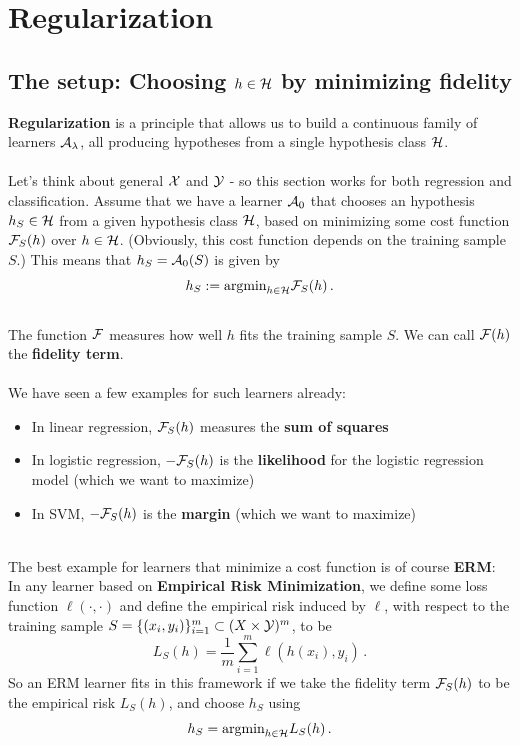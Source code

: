 \section{Regularization}


\subsection{The setup: Choosing $h\in\mathcal{H}$ by minimizing fidelity}

{\bf Regularization} is a principle that allows us to build a continuous family
of learners $\mathcal{A}_\lambda$, all producing hypotheses from a single
 hypothesis class $\mathcal{H}$.
\\~\\
 Let's think about general $\mathcal{X}$ and $\mathcal{Y}$ - so this section works for both
 regression and classification.
Assume that we have a learner $\mathcal{A}_0$ that chooses an hypothesis
$h_S\in\mathcal{H}$ 
from a given hypothesis class $\mathcal{H}$, based
on minimizing some cost function $\mathcal{F}_S(h)$ over $h\in\mathcal{H}$.
(Obviously, this cost function depends on the training sample
$S$.) 
This means that $h_S=\mathcal{A}_0(S)$ is given by
\[
  h_S := \text{argmin}_{h\in\mathcal{H}} \mathcal{F}_S(h)\,.
\]
~\\
The function $\mathcal{F}$ measures how well $h$ fits the training sample $S$. We can
call $\mathcal{F}(h)$ the {\bf fidelity term}.
\\~\\
We have seen a few examples for such learners already:
\begin{itemize}
  \item In linear regression, $\mathcal{F}_S(h)$ measures the {\bf sum of squares}
  \item In logistic regression, $-\mathcal{F}_S(h)$ is the {\bf likelihood} for the logistic
    regression model (which we want to
    maximize)
  \item In SVM, $-\mathcal{F}_S(h)$ is the {\bf margin} (which we want to maximize)
\end{itemize}
~\\
The best example for learners that minimize a cost function is
of course {\bf ERM}: In any learner based on {\bf Empirical Risk Minimization}, we
define some loss function $\ell(\cdot,\cdot)$ and 
define the empirical risk induced by $\ell$, with respect to the training sample
$S=\{\left( x_i,y_i \right)\}_{i=1}^m\subset (X\times \mathcal{Y})^m$, to be
\[
  L_S(h) = \frac{1}{m} \sum_{i=1}^m \ell(h(x_i),y_i)\,.
\]
So an ERM learner fits in this framework if we take the fidelity term  
$\mathcal{F}_S(h)$ to be the empirical risk $L_S(h)$, and choose $h_S$ using
\[
  h_S = \text{argmin}_{h\in\mathcal{H}} L_S(h)\,.
\]


